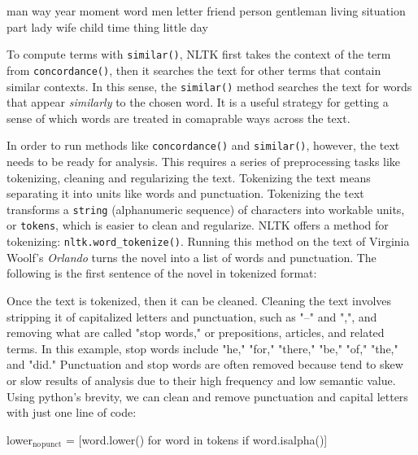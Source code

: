 \documentclass[11pt]{article}
\begin{document}
\begin{SOURCE}
man way year moment word men letter friend person gentleman living
situation part lady wife child time thing little day
\end{SOURCE}

To compute terms with \texttt{similar()}, NLTK first takes the context of the
term from \texttt{concordance()}, then it searches the text for other terms
that contain similar contexts. In this sense, the \texttt{similar()} method
searches the text for words that appear \emph{similarly} to the chosen
word. It is a useful strategy for getting a sense of which words are
treated in comaprable ways across the text.


In order to run methods like \texttt{concordance()} and \texttt{similar()}, however,
the text needs to be ready for analysis. This requires a series of
preprocessing tasks like tokenizing, cleaning and regularizing the
text. Tokenizing the text means separating it into units like words
and punctuation. Tokenizing the text transforms a \texttt{string}
(alphanumeric sequence) of characters into workable units, or
\texttt{tokens}, which is easier to clean and regularize. NLTK offers a
method for tokenizing: \texttt{nltk.word\_tokenize()}. Running this method on
the text of Virginia Woolf's \emph{Orlando} turns the novel into a list of
words and punctuation. The following is the first sentence of the
novel in tokenized format:

\begin{SOURCE}
\end{SOURCE}

Once the text is tokenized, then it can be cleaned. Cleaning the text
involves stripping it of capitalized letters and punctuation, such as
"--" and ",", and removing what are called "stop words," or
prepositions, articles, and related terms. In this example, stop words
include "he," "for," "there," "be," "of," "the," and "did."
Punctuation and stop words are often removed because tend to skew or
slow results of analysis due to their high frequency and low semantic
value. Using python's brevity, we can clean and remove punctuation and
capital letters with just one line of code:

\begin{SOURCE}
lower\(_{\text{no}}\)\(_{\text{punct}}\) = [word.lower() for word in tokens if word.isalpha()]
\end{SOURCE}
\end{document}
